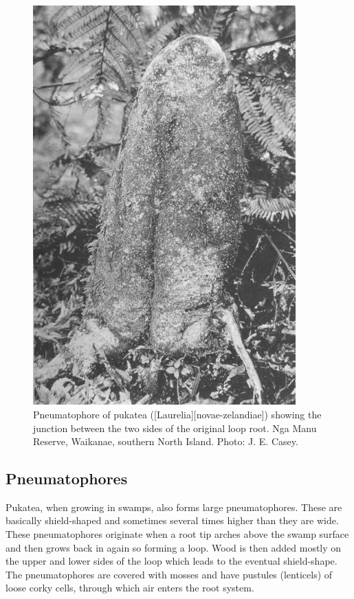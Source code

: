\begin{figure}[!htb]
\begin{minipage}[t]{0.44\textwidth}
    	\includegraphics[width=0.9\textwidth]{graphics/figure11pukatea.jpg}
    	\caption[Pneumatophore of pukatea showing the junction between the two sides of the original loop root]{Pneumatophore of pukatea ([Laurelia][novae-zelandiae]) showing the junction between the two sides of the original loop root.
    	Nga Manu Reserve, Waikanae, southern North Island.
    	Photo:  J. E. Casey.}%
    	\label{fig:11pukatea}
	\end{minipage}
\end{figure}

\subsection{Pneumatophores}

Pukatea, when growing in swamps, also forms large pneumatophores.
These are basically shield-shaped and sometimes several times higher than they are wide.
These pneumatophores originate when a root tip arches above the swamp surface and then grows back in again so forming a loop.
Wood is then added mostly on the upper and lower sides of the loop which leads to the eventual shield-shape.
The pneumatophores are covered with mosses and have pustules (lenticels) of loose corky cells, through which air enters the root system.

